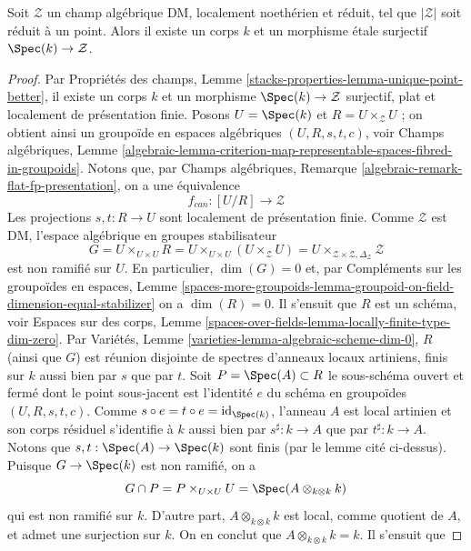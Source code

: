 \begin{lemma}
\label{lemma-DM-residual-gerbe}
Soit $\mathcal{Z}$ un champ algébrique DM, localement noethérien et réduit,
tel que $|\mathcal{Z}|$ soit réduit à un point. Alors il existe un corps $k$
et un morphisme étale surjectif $\Spec(k) \to \mathcal{Z}$.
\end{lemma}

\begin{proof}
Par Propriétés des champs,
Lemme \ref{stacks-properties-lemma-unique-point-better},
il existe un corps $k$ et un morphisme $\Spec(k) \to \mathcal{Z}$ surjectif,
plat et localement de présentation finie. Posons $U = \Spec(k)$ et
$R = U \times_\mathcal{Z} U$ ; on obtient ainsi un groupoïde en espaces
algébriques $(U, R, s, t, c)$, voir Champs algébriques, Lemme
\ref{algebraic-lemma-criterion-map-representable-spaces-fibred-in-groupoids}.
Notons que, par Champs algébriques,
Remarque \ref{algebraic-remark-flat-fp-presentation}, on a une équivalence
$$
f_{can} : [U/R] \longrightarrow \mathcal{Z}
$$
Les projections $s, t : R \to U$ sont localement de présentation finie.
Comme $\mathcal{Z}$ est DM, l'espace algébrique en groupes stabilisateur
$$
G = U \times_{U \times U} R = U \times_{U \times U} (U \times_\mathcal{Z} U) =
U \times_{\mathcal{Z} \times \mathcal{Z}, \Delta_\mathcal{Z}} \mathcal{Z}
$$
est non ramifié sur $U$. En particulier, $\dim(G) = 0$ et, par Compléments
sur les groupoïdes en espaces, Lemme
\ref{spaces-more-groupoids-lemma-groupoid-on-field-dimension-equal-stabilizer}
on a $\dim(R) = 0$. Il s'ensuit que $R$ est un schéma, voir Espaces sur des
corps, Lemme
\ref{spaces-over-fields-lemma-locally-finite-type-dim-zero}.
Par Variétés, Lemme \ref{varieties-lemma-algebraic-scheme-dim-0},
$R$ (ainsi que $G$) est réunion disjointe de spectres d'anneaux locaux
artiniens, finis sur $k$ aussi bien par $s$ que par $t$. Soit
$P = \Spec(A) \subset R$ le sous-schéma ouvert et fermé dont le point
sous-jacent est l'identité $e$ du schéma en groupoïdes $(U, R, s, t, c)$.
Comme $s \circ e = t \circ e = \text{id}_{\Spec(k)}$, l'anneau $A$ est local
artinien et son corps résiduel s'identifie à $k$ aussi bien par
$s^\sharp : k \to A$ que par $t^\sharp : k \to A$.
Notons que $s, t : \Spec(A) \to \Spec(k)$ sont finis (par le lemme cité
ci-dessus). Puisque $G \to \Spec(k)$ est non ramifié, on a
$$
G \cap P = P \times_{U \times U} U = \Spec(A \otimes_{k \otimes k} k)
$$
qui est non ramifié sur $k$. D'autre part,
$A \otimes_{k \otimes k} k$ est local, comme quotient de $A$, et admet une
surjection sur $k$. On en conclut que $A \otimes_{k \otimes k} k = k$. Il s'ensuit que

\end{proof}

